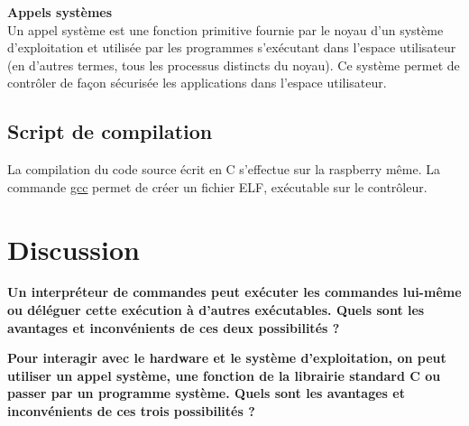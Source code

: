 \documentclass[10pt,a4paper]{article}
\begin{document}
\textbf{Appels systèmes\\}
Un appel système est une fonction primitive fournie par le noyau d'un système d'exploitation et utilisée par les programmes s'exécutant dans l'espace utilisateur (en d'autres termes, tous les processus distincts du noyau). Ce système permet de contrôler de façon sécurisée les applications dans l'espace utilisateur.

\subsection{Script de compilation}
La compilation du code source écrit en C s'effectue sur la raspberry même. La commande \url{gcc} permet de créer un fichier ELF, exécutable sur le contrôleur. 

\section{Discussion}
\begin{center}
\textbf{Un interpréteur de commandes peut exécuter les commandes lui-même ou déléguer cette exécution à d'autres exécutables. Quels sont les avantages et inconvénients de ces deux possibilités ?}\end{center}

\begin{center}
\textbf{Pour interagir avec le hardware et le système d'exploitation, on peut utiliser un appel système, une  fonction  de  la  librairie  standard  C  ou  passer  par  un  programme  système.  Quels  sont  les avantages et inconvénients de ces trois possibilités ?}
\end{center}
\end{document}
